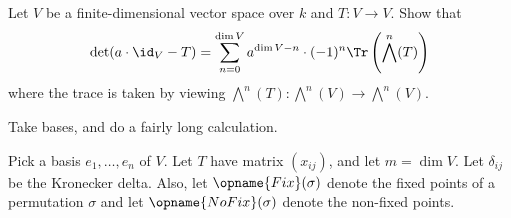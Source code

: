 


\begin{problem}
	\yod
	Let $V$ be a finite-dimensional vector space over $k$ and $T \colon V \to V$.
	Show that
	\[
		\det(a \cdot \id_V - T) =
		\sum_{n=0}^{\dim V} a^{\dim V-n} \cdot (-1)^n
		\Tr\left( \bigwedge^n(T) \right)
	\]
	where the trace is taken by viewing $\bigwedge^n(T) \colon \bigwedge^n(V) \to \bigwedge^n(V)$.
	\begin{hint}
		Take bases, and do a fairly long calculation.
	\end{hint}
	\begin{sol}
		\newcommand{\Fix}{\opname{Fix}}
		\newcommand{\NoFix}{\opname{NoFix}}
		Pick a basis $e_1, \dots, e_n$ of $V$.
		Let $T$ have matrix $(x_{ij})$, and let $m = \dim V$.
		Let $\delta_{ij}$ be the Kronecker delta.
		Also, let $\Fix(\sigma)$ denote the fixed points of a permutation $\sigma$
		and let $\NoFix(\sigma)$ denote the non-fixed points.


\end{sol}
\end{problem}
